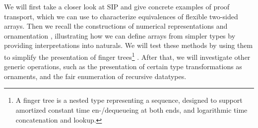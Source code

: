 We will first take a closer look at SIP \cite{iri} and give concrete examples of proof transport, which we can use to characterize equivalences of flexible two-sided arrays. Then we recall the constructions of numerical representations \cite{calcdata} and ornamentation \cite{progorn}, illustrating how we can define arrays from simpler types by providing interpretations into naturals. We will test these methods by using them to simplify the presentation of finger trees\footnote{A finger tree is a nested type representing a sequence, designed to support amortized constant time en-/dequeueing at both ends, and logarithmic time concatenation and lookup.} \cite{fingertrees}. After that, we will investigate other generic operations, such as the presentation of certain type transformations as ornaments, and the fair enumeration of recursive datatypes.